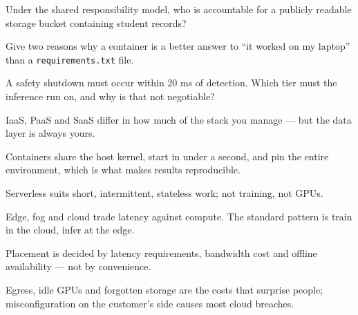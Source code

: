 \begin{checkpoint}
\begin{tightnum}
  \item Under the shared responsibility model, who is accountable for a publicly
        readable storage bucket containing student records?
  \item Give two reasons why a container is a better answer to ``it worked on my
        laptop'' than a \texttt{requirements.txt} file.
  \item A safety shutdown must occur within 20 ms of detection. Which tier must the
        inference run on, and why is that not negotiable?
\end{tightnum}
\end{checkpoint}

\begin{chaptersummary}
\begin{tight}
  \item IaaS, PaaS and SaaS differ in how much of the stack you manage --- but the
        data layer is always yours.
  \item Containers share the host kernel, start in under a second, and pin the
        entire environment, which is what makes results reproducible.
  \item Serverless suits short, intermittent, stateless work; not training, not GPUs.
  \item Edge, fog and cloud trade latency against compute. The standard pattern is
        train in the cloud, infer at the edge.
  \item Placement is decided by latency requirements, bandwidth cost and offline
        availability --- not by convenience.
  \item Egress, idle GPUs and forgotten storage are the costs that surprise people;
        misconfiguration on the customer's side causes most cloud breaches.
\end{tight}
\end{chaptersummary}

